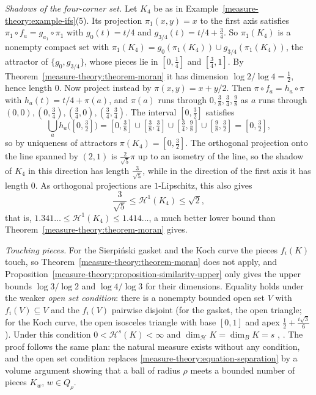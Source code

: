 \begin{example}\label{measure-theory:example-four-corner-projections}
\emph{Shadows of the four-corner set.} Let $K_4$ be as in Example~\ref{measure-theory:example-ifs}(5). Its projection $\pi_1(x, y) = x$ to the first axis satisfies $\pi_1 \circ f_a = g_{a_1} \circ \pi_1$ with
$g_0(t) = t/4$ and $g_{3/4}(t) = t/4 + \frac34$. So $\pi_1(K_4)$ is a nonempty compact set with $\pi_1(K_4) = g_0(\pi_1(K_4)) \cup g_{3/4}(\pi_1(K_4))$, the attractor of $\{g_0, g_{3/4}\}$, whose pieces lie in
$[0, \frac14]$ and $[\frac34, 1]$. By Theorem~\ref{measure-theory:theorem-moran} it has dimension $\log 2/\log 4 = \frac12$, hence length $0$. Now project instead by $\pi(x, y) = x + y/2$. Then
$\pi \circ f_a = h_a \circ \pi$ with $h_a(t) = t/4 + \pi(a)$, and $\pi(a)$ runs through $0, \frac38, \frac34, \frac98$ as $a$ runs through $(0, 0), (0, \frac34), (\frac34, 0), (\frac34, \frac34)$. The interval
$[0, \frac32]$ satisfies
\[
\bigcup_ah_a\bigl([0, \tfrac32]\bigr) = [0, \tfrac38] \cup [\tfrac38, \tfrac34] \cup [\tfrac34, \tfrac98] \cup [\tfrac98, \tfrac32] = [0, \tfrac32],
\]
so by uniqueness of attractors $\pi(K_4) = [0, \frac32]$. The orthogonal projection onto the line spanned by $(2, 1)$ is $\frac{2}{\sqrt5}\pi$ up to an isometry of the line, so the shadow of $K_4$ in this
direction has length $\frac{3}{\sqrt5}$, while in the direction of the first axis it has length $0$. As orthogonal projections are $1$-Lipschitz, this also gives
\[
\frac{3}{\sqrt5} \leq \mathcal{H}^1(K_4) \leq \sqrt2,
\]
that is, $1.341\ldots \leq \mathcal{H}^1(K_4) \leq 1.414\ldots$, a much better lower bound than Theorem~\ref{measure-theory:theorem-moran} gives.
\end{example}

\begin{remark}\label{measure-theory:remark-open-set-condition}
\emph{Touching pieces.} For the Sierpi\'nski gasket and the Koch curve the pieces $f_i(K)$ touch, so Theorem~\ref{measure-theory:theorem-moran} does not apply, and
Proposition~\ref{measure-theory:proposition-similarity-upper} only gives the upper bounds $\log 3/\log 2$ and $\log 4/\log 3$ for their dimensions. Equality holds under
the weaker \emph{open set condition}: there is a nonempty bounded open set $V$ with $f_i(V) \subseteq V$ and the $f_i(V)$ pairwise disjoint (for the gasket, the open triangle; for the Koch curve, the
open isosceles triangle with base $[0, 1]$ and apex $\frac12 + \frac{i\sqrt3}{6}$). Under this condition $0 < \mathcal{H}^s(K) < \infty$ and $\dim_{\mathcal{H}}K = \dim_BK = s$
\cite{hutchinson-1981}, \cite[Chapter 9]{falconer-fractal}. The proof follows the same plan: the natural measure exists without any condition, and the open set condition replaces
\eqref{measure-theory:equation-separation} by a volume argument showing that a ball of radius $\rho$ meets a bounded number of pieces $K_w$, $w \in Q_\rho$.
\end{remark}

